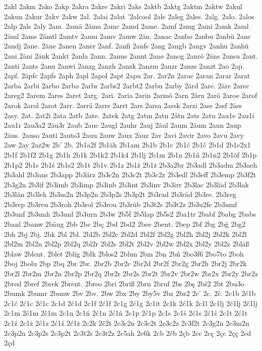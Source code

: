 2akl
2akm
2ako
2akp
2akra
2akre
2akri
2aks
2aktb
2aktg
2aktm
2aktw
2akul
2akun
2akur
2akv
2akw
2al.
2alai
2alat
'2alcool
2ale
2aleg
2ales.
2alg.
2alo.
2alos
2alp
2als
2aly
2am.
2amä
2äma
2amc
2amd
2ame.
2amf
2amg
2ami
2amk
2aml
2äml
2ams
2ämtl
2amtv
2amu
2amv
2amw
2än.
2anac
2anbo
2anbu
2anbü
2anc
2andj
2ane.
2äne
2anen
2aner
2anf.
2anfi
2anfs
2ang
2angb
2angv
2anhu
2anhü
2ani
2äni
2änk
2ankt
2anla
2ann.
2anns
2annt
2anø
2anog
2anrö
2äns
2ansu
2ant.
2anti
2ants
2anu
2anwi
2anzg
2anzh
2anzk
2anzm
2anzr
2anzs
2anzt
2ao
2ap.
2apf.
2äpfc
2apfs
2aph
2apl
2apol
2apt
2apu
2ar.
2ar2n
2arae
2aran
2arar
2arat
2arba
2arbi
2arbo
2arbø
2arbr
2arbs2
2arbt2
2arbu
2arby
2ärd
2are.
2äre
2arec
2areg2
2arem
2ares
2aret
2arg.
2ari.
2aria
2arin
2armö
2arn
2årn
2arö
2aroe
2arof
2arok
2arol
2arot
2arr.
2arrä
2arrs
2arrt
2ars
2arsa
2arsk
2arzi
2ase
2asf
2äss
2asy.
2at.
2at2i
2ata
2atb
2ate.
2atek
2atg
2atm
2atn
2åtn
2ats
2atu
2au1e
2au1i
2au1r
2au3a2
2äu3r
2aub
2auc
2augl
2auhr
2auj
2äul
2aum
2äum
2aun
2aup
2äus.
2auso
2auti
2auts3
2auu
2auw
2aux
2auz
2av
2avi
2avir
2avo
2avu
2avy
2aw
2ay
2az2w
2b'
2b.
2b1a2f
2b1äh
2b1am
2b1b
2b1c
2b1ć
2b1č
2b1d
2b1e2x1
2b1f
2b1f2
2b1g
2b1h
2b1k
2b1k2
2b1k4
2b1lj
2b1m
2b1n
2b1ń
2b1n2
2b1öf
2b1p
2b1p2
2b1s
2b1ś
2b1s2
2b1t
2b1v
2b1z
2b1ź
2b1ż
2b3a2br
2b3adl
2b3adm
2b3aeh
2b3ahl
2b3ans
2b3app
2b3ärz
2b3c2n
2b3c2t
2b3c2z
2b3edl
2b3eff
2b3emp
2b3f2t
2b3g2n
2b3if
2b3imb
2b3imp
2b3inb
2b3int
2b3inv
2b3irr
2b3lac
2b3läd
2b3lak
2b3län
2b3leh
2b3m2n
2b3p2n
2b3p2s
2b3p2t
2b3rad
2b3räd
2b3re.
2b3reg
2b3rep
2b3reu
2b3roh
2b3rol
2b3rou
2b3rüb
2b3t2s
2b3t2z
2b3u2fe
2b3umf
2b3unf
2b3unh
2b3unl
2b3urn
2b3w
2b5f
2b5lap
2b5s2
2ba1tr
2babf
2babg
2babs
2banl
2banw
2bäug
2bb
2bc
2bç
2bd
2bd2
2bee
2bent.
2bep
2bf
2bg
2bğ
2bg2
2bh
2bj
2bj.
2bk
2bl
2bl.
2bl2b
2bl2c
2bl2d
2bl2f
2bl2g
2bl2h
2bl2j
2bl2k
2bl2l
2bl2m
2bl2n
2bl2p
2bl2q
2bl2r
2bl2s
2bl2t
2bl2v
2bl2w
2bl2x
2bl2y
2bl2z
2bläß
2blaw
2blent.
2blet
2blig
2błk
2blos2
2blun
2bm
2bn
2bň
2bo3f6
2bo7to
2boh
2boj
2bolu
2bp
2bq
2br
2br.
2br2b
2br2c
2br2d
2br2f
2br2g
2br2h
2br2j
2br2k
2br2l
2br2m
2br2n
2br2p
2br2q
2br2r
2br2s
2br2t
2br2v
2br2w
2br2x
2br2y
2br2z
2bred
2bref
2brek
2brent.
2breo
2bri
2briß
2brn
2bruf
2bs
2bş
2bš2
2bt
2bu3o
2bumk
2bumr
2bunw
2bv
2bv.
2bw
2bx
2by
2by5v
2bz
2bz2
2c'
2c.
2č.
2c1b
2ć1b
2c1ć
2ć1c
2č1c
2c1d
2ć1d
2c1f
2ć1f
2c1g
2ć1g
2c1it
2c1k
2ć1k
2c1l
2c1lj
2ć1lj
2č1lj
2c1m
2ć1m
2č1m
2c1n
2c1ń
2ć1n
2ć1ń
2c1p
2ć1p
2c1s
2c1ś
2ć1s
2ć1ś
2c1t
2ć1t
2c1ź
2c1ż
2ć1z
2ć1ź
2ć1ż
2c2k
2č2t
2c3c2n
2c3c2t
2c3c2z
2c3f2t
2c3g2n
2c3m2n
2c3p2n
2c3p2s
2c3p2t
2c3t2s
2c3t2z
2c5ah
2c6k
2cb
2čb
2çb
2cc
2cç
2çc
2çç
2cd
2çd
